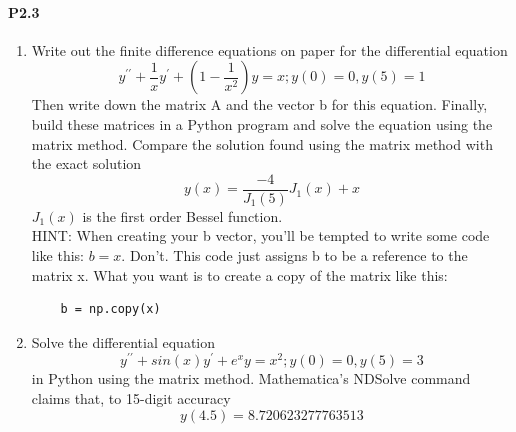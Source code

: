 \documentclass{book}
\theoremstyle{plain}
\theoremstyle{definition}
\numberwithin{exm}{chapter}
\theoremstyle{remark}
\theoremstyle{summary}
\theoremstyle{overview}
\begin{document}
\paragraph*{P2.3}
	\begin{enumerate}[label=(\alph*)]
		\item Write out the finite difference equations on paper for the differential equation
		\begin{equation} \label{eq:26}
				y^{\prime\prime} + \frac{1}{x}y^\prime + (1 - \frac{1}{x^2})y=x ; y(0) = 0 , y(5) = 1
		\end{equation}
		Then write down the matrix A and the vector b for this equation. Finally, build these matrices in a Python program and solve the equation using the matrix method. Compare the solution found using the matrix method with the exact solution
		\begin{equation*}
			y(x) = \frac{-4}{J_1(5)}J_1(x)+x
		\end{equation*}
		$J_1(x)$ is the first order Bessel function.\\ HINT: When creating your b vector, you\rq ll be tempted to write some code like this: $b=x$. Don\rq t. This code just assigns b to be a reference to the matrix x. What you want is to create a copy of the matrix like this: \\ 
		\begin{lstlisting}	
	b = np.copy(x)
	\end{lstlisting}
	\item 	Solve the differential equation
	\begin{equation}\label{eq:27}
	y^{\prime\prime} + sin(x)y^\prime+e^xy=x^2 ; y(0) = 0, y(5)=3
\end{equation}		
	in Python using the matrix method. Mathematica\rq s NDSolve command claims that, to 15-digit accuracy
		\begin{equation*}
			y(4.5) = 8.720623277763513
		\end{equation*}


\end{enumerate}
\end{document}
